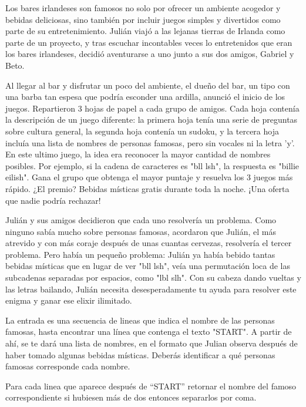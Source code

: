 
Los bares irlandeses son famosos no solo por ofrecer un ambiente acogedor y bebidas deliciosas, sino también por incluir juegos simples y divertidos como parte de su entretenimiento. Julián viajó a las lejanas tierras de Irlanda como parte de un proyecto, y tras escuchar incontables veces lo entretenidos que eran los bares irlandeses, decidió aventurarse a uno junto a sus dos amigos, Gabriel y Beto.

Al llegar al bar y disfrutar un poco del ambiente, el dueño del bar, un tipo con una barba tan espesa que podría esconder una ardilla, anunció el inicio de los juegos. Repartieron $3$ hojas de papel a cada grupo de amigos. Cada hoja contenía la descripción de un juego diferente: la primera hoja tenía una serie de preguntas sobre cultura general, la segunda hoja contenía un sudoku, y la tercera hoja incluía una lista de nombres de personas famosas, pero sin vocales ni la letra 'y'. En este ultimo juego, la idea era reconocer la mayor cantidad de nombres posibles. Por ejemplo, si la cadena de caracteres es "bll lsh", la respuesta es "billie eilish". Gana el grupo que obtenga el mayor puntaje y resuelva los 3 juegos más rápido. ¿El premio? Bebidas místicas gratis durante toda la noche. ¡Una oferta que nadie podría rechazar!

Julián y sus amigos decidieron que cada uno resolvería un problema. Como ninguno sabía mucho sobre personas famosas, acordaron que Julián, el más atrevido y con más coraje después de unas cuantas cervezas, resolvería el tercer problema. Pero había un pequeño problema: Julián ya había bebido tantas bebidas místicas que en lugar de ver "bll lsh", veía una permutación loca de las subcadenas separadas por espacios, como "lbl slh". Con su cabeza dando vueltas y las letras bailando, Julián necesita desesperadamente tu ayuda para resolver este enigma y ganar ese elixir ilimitado.


La entrada es una secuencia de lineas que indica el nombre de las personas famosas, hasta encontrar una línea que contenga el texto "START". A partir de ahí, se te dará una lista de nombres, en el formato que Julian observa después de haber tomado algunas bebidas místicas. Deberás identificar a qué personas famosas corresponde cada nombre.
\outputText

Para cada linea que aparece después de “START” retornar el nombre del famoso correspondiente si hubiesen más de dos entonces separarlos por coma.

\exampleCases

\begin{example}
\end{example}
